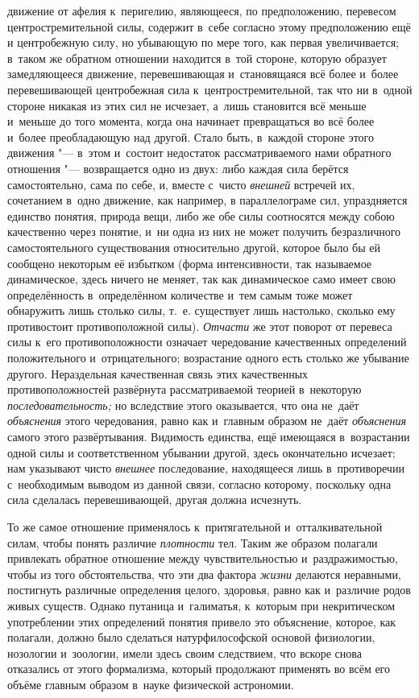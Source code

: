 движение от афелия к~перигелию, являющееся, по предположению, перевесом
центростремительной силы, содержит в~себе согласно этому предположению ещё и
центробежную силу, но убывающую по мере того, как первая увеличивается; в~таком
же обратном отношении находится в~той стороне, которую образует замедляющееся
движение, перевешивающая и~становящаяся всё более и~более перевешивающей
центробежная сила к~центростремительной, так что ни в~одной стороне никакая из
этих сил не исчезает, а~лишь становится всё меньше и~меньше до того момента,
когда она начинает превращаться во всё более и~более преобладающую над другой.
Стало быть, в~каждой стороне этого движения "--- в~этом и~состоит недостаток
рассматриваемого нами обратного отношения "--- возвращается одно из двух: либо
каждая сила берётся самостоятельно, сама по себе, и, вместе с~чисто
{\em внешней} встречей их, сочетанием в~одно движение, как например, в
параллелограме сил, упраздняется единство понятия, природа вещи, либо же обе
силы соотносятся между собою качественно через понятие, и~ни одна из них не
может получить безразличного самостоятельного существования относительно
другой, которое было бы ей сообщено некоторым её избытком (форма интенсивности,
так называемое динамическое, здесь ничего не меняет, так как динамическое само
имеет свою определённость в~определённом количестве и~тем самым тоже может
обнаружить лишь столько силы, т.~е. существует лишь настолько, сколько ему
противостоит противоположной силы). {\em Отчасти} же этот поворот от перевеса
силы к~его противоположности означает чередование качественных определений
положительного и~отрицательного; возрастание одного есть столько же убывание
другого. Нераздельная качественная связь этих качественных противоположностей
развёрнута рассматриваемой теорией в~некоторую {\em последовательность;} но
вследствие этого оказывается, что она не~даёт {\em объяснения} этого
чередования, равно как и~главным образом не~даёт {\em объяснения} самого этого
развёртывания. Видимость единства, ещё имеющаяся в~возрастании одной силы и
соответственном убывании другой, здесь окончательно исчезает; нам указывают
чисто {\em внешнее} последование, находящееся лишь в~противоречии с~необходимым
выводом из данной связи, согласно которому, поскольку одна сила сделалась
перевешивающей, другая должна исчезнуть.

То же самое отношение применялось к~притягательной и~отталкивательной силам,
чтобы понять различие {\em плотности} тел. Таким же образом полагали привлекать
обратное отношение между чувствительностью и~раздражимостью, чтобы из того
обстоятельства, что эти два фактора {\em жизни} делаются неравными, постигнуть
различные определения целого, здоровья, равно как и~различие родов живых
существ. Однако путаница и~галиматья, к~которым при некритическом употреблении
этих определений понятия привело это объяснение, которое, как полагали, должно
было сделаться натурфилософской основой физиологии, нозологии и~зоологии, имели
здесь своим следствием, что вскоре снова отказались от этого формализма,
который продолжают применять во всём его объёме главным образом в~науке
физической астрономии.

